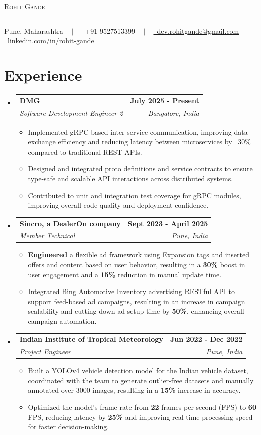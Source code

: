 \documentclass[letterpaper,11pt]{article}
\makeatletter
\newcommand{\resumeItem}[1]{
  \item\small{
	{#1 \vspace{-2pt}}
  }
}
\newcommand{\resumeSubheading}[4]{
  \vspace{-2pt}\item
	\begin{tabular*}{1.0\textwidth}[t]{l@{\extracolsep{\fill}}r}
  	\textbf{#1} & \textbf{\small #2} \\
  	\textit{\small#3} & \textit{\small #4} \\
	\end{tabular*}\vspace{-7pt}
}
\newcommand{\resumeSubHeadingListStart}{\begin{itemize}[leftmargin=0.0in, label={}]}
\newcommand{\resumeSubHeadingListEnd}{\end{itemize}}
\newcommand{\resumeItemListStart}{\begin{itemize}}
\newcommand{\resumeItemListEnd}{\end{itemize}\vspace{-5pt}}
\makeatother
\begin{document}
\begin{center}
	{\LARGE \scshape \color{accent}Rohit Gande} \\ \vspace{2pt}
	\color{accent}\rule{\linewidth}{0.6pt} \vspace{3pt}
	\color{black}\small Pune, Maharashtra ~ $|$ ~ \raisebox{-0.1\height}\faPhone\ +91 9527513399 ~ $|$ ~ \href{mailto:dev.rohitgande@gmail.com}{\raisebox{-0.2\height}\faEnvelope\ \underline{dev.rohitgande@gmail.com}} ~ $|$ ~
	\href{https://linkedin.com/in/rohit-gande}{\raisebox{-0.2\height}\faLinkedin\ \underline{linkedin.com/in/rohit-gande}}
	\vspace{-8pt}
\end{center}

\section{Experience}
  \resumeSubHeadingListStart
  	\resumeSubheading
  	{DMG}{July 2025 - Present}
  	{Software Development Engineer 2}{Bangalore, India}
  	\resumeItemListStart
    	\resumeItem{Implemented gRPC-based inter-service communication, improving data exchange efficiency and reducing latency between microservices by ~30\% compared to traditional REST APIs.}
    	\resumeItem{Designed and integrated proto definitions and service contracts to ensure type-safe and scalable API interactions across distributed systems.}
        \resumeItem{Contributed to unit and integration test coverage for gRPC modules, improving overall code quality and deployment confidence.}
	\resumeItemListEnd
	\resumeSubheading
  	{Sincro, a DealerOn company}{Sept 2023 - April 2025}
  	{Member Technical}{Pune, India}
  	\resumeItemListStart
    	\resumeItem{\textbf{Engineered} a flexible ad framework using Expansion tags and inserted offers and content based on user behavior, resulting in a \textbf{30\%} boost in user engagement and a \textbf{15\%} reduction in manual update time.}
    	\resumeItem{Integrated Bing Automotive Inventory advertising RESTful API to support feed-based ad campaigns, resulting in an increase in campaign scalability and cutting down ad setup time by \textbf{50\%}, enhancing overall campaign automation.}
	\resumeItemListEnd
    \resumeSubheading
  	{Indian Institute of Tropical Meteorology}{Jun 2022 - Dec 2022}
  	{Project Engineer}{Pune, India}
  	\resumeItemListStart
    	\resumeItem{Built a YOLOv4 vehicle detection model for the Indian vehicle dataset, coordinated with the team to generate outlier-free datasets and manually annotated over 3000 images, resulting in a \textbf{15\%} increase in accuracy.}
    	\resumeItem{Optimized the model's frame rate from \textbf{22} frames per second (FPS) to \textbf{60} FPS, reducing latency by \textbf{25\%} and improving real-time processing speed for faster decision-making.}
	\resumeItemListEnd
  \resumeSubHeadingListEnd
\vspace{-16pt}
\end{document}
